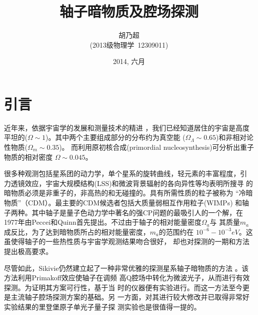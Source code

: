 \documentclass[twocolumn,12pt,a4paper]{article}
\title{轴子暗物质及腔场探测}
\author{胡乃超\\(2013级物理学\, 12309011)}
\date{2014, 六月}
\begin{document}

\renewcommand{\contentsname}{目录}
\tableofcontents

\section{引言}
近年来，依据宇宙学的发展和测量技术的精进
\cite{hanany00}\cite{perlmutter99}，我们已经知道居住的宇宙是高度
平坦的($\Omega \sim 1$)。其中两个主要组成部分的分布约为真空能
($\Omega_{\Lambda} \sim 0.65$)和非相对论性物质($\Omega_m \sim 0.35$)。
而利用原初核合成(primordial nucleosynthesis)可分析出重子物质的相对密度
$\Omega \sim 0.045$\cite{schramm98}。\par
很多种观测包括星系团的动力学，单个星系的旋转曲线，轻元素的丰富程度，引
力透镜效应，宇宙大规模结构(LSS)和微波背景辐射的各向异性等均表明所搜寻
的暗物质必须是非重子的，非高热的和无碰撞的。具有所需性质的粒子被称为
``冷暗物质''（CDM）。最主要的CDM候选者包括大质量弱相互作用粒子(WIMPs)
和轴子两种。其中轴子是量子色动力学中著名的强CP问题的最吸引人的一个解，在
1977年由Peccei和Quinn首先提出。不过由于轴子的相对能量密度$\Omega_a$与
其质量$m_a$成反比，为了达到暗物质所占的相对能量密度，$m_a$的范围约在
$10^{-6}-10^{-3}eV$。这虽使得轴子的一些热性质与宇宙学观测结果吻合很好\cite{sikivie12}，
却也对探测的一期和方法提出极高要求。\par
尽管如此，Sikivie仍然建立起了一种非常优雅的探测星系轴子暗物质的方法
\cite{sikivie83a}\cite{sikivie85}。该方法利用Primakoff效应使轴子在调频
高Q腔场中转化为微波光子，从而进行有效探测。为证明其方案可行性，基于当
时的仪器便有实验进行。而这一方法至今更是主流轴子腔场探测方案的基础。另
一方面，对其进行较大修改并已取得非常好实验结果的里登堡原子单光子量子探
测实验也是很值得一提的。
\end{document}
